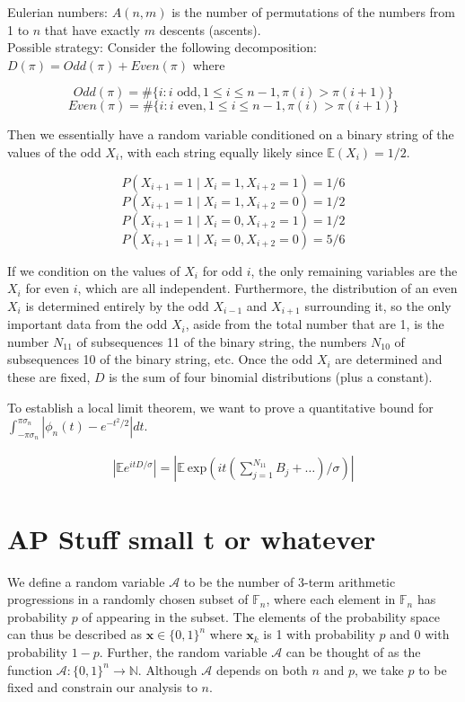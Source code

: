 \documentclass{article}
\newcommand{\p}[1]{\left(#1\right)}
\newcommand{\abs}[1]{\left\lvert#1\right\rvert}
\newcommand{\ap}{\mathcal{A}}
\newcommand{\E}{\mathbb{E}}
\newcommand{\F}{\mathbb{F}}
\newcommand{\bbn}{\mathbb{N}}
\newcommand{\bfx}{\mathbf{x}}
\theoremstyle{definition}
\theoremstyle{remark}
\begin{document}
Eulerian numbers: $A(n,m)$ is the number of permutations of the numbers from 1 to $n$ that have exactly $m$ descents (ascents). \\
Possible strategy: Consider the following decomposition: $D(\pi) = Odd(\pi) + Even(\pi)$ where

\[Odd(\pi) = \#\{i: i \text{ odd}, 1\leq i \leq n-1, \pi(i) > \pi(i+1)\}\]
\[Even(\pi) = \#\{i: i \text{ even}, 1\leq i \leq n-1, \pi(i) > \pi(i+1)\}\]

Then we essentially have a random variable conditioned on a binary string of the values of the odd $X_i$, with each string equally likely since $\E(X_i) = 1/2$.

\[ P(X_{i+1} = 1 \mid X_i = 1, X_{i+2} = 1) = 1/6 \]
\[ P(X_{i+1} = 1 \mid X_i = 1, X_{i+2} = 0) = 1/2 \]
\[ P(X_{i+1} = 1 \mid X_i = 0, X_{i+2} = 1) = 1/2 \]
\[ P(X_{i+1} = 1 \mid X_i = 0, X_{i+2} = 0) = 5/6 \]

If we condition on the values of $X_i$ for odd $i$, the only remaining variables are the $X_i$ for even $i$, which are all independent. Furthermore, the distribution of an even $X_i$ is determined entirely by the odd $X_{i-1}$ and $X_{i+1}$ surrounding it, so the only important data from the odd $X_i$, aside from the total number that are 1, is the number $N_{11}$ of subsequences 11 of the binary string, the numbers $N_{10}$ of subsequences 10 of the binary string, etc. Once the odd $X_i$ are determined and these are fixed, $D$ is the sum of four binomial distributions (plus a constant).

To establish a local limit theorem, we want to prove a quantitative bound for $\int_{-\pi\sigma_n}^{\pi\sigma_n} \abs{\phi_n(t) - e^{-t^2/2}} dt$.


\begin{align*}
\abs{\E e^{itD/\sigma}} = \abs{\E\  \mathrm{exp}\p{it\p{\sum_{j=1}^{N_{11}} B_j + \ldots}/\sigma}}
\end{align*}

\section{AP Stuff small t or whatever}
We define a random variable $\ap$ to be the number of 3-term arithmetic progressions in a randomly chosen subset of $\F_n$, where each element in $\F_n$ has probability $p$ of appearing in the subset. The elements of the probability space can thus be described as $\bfx \in \{0,1\}^n$ where $\bfx_k$ is 1 with probability $p$ and 0 with probability $1-p$. Further, the random variable $\ap$ can be thought of as the function $\ap : \{0,1\}^n \to \bbn$. Although $\ap$ depends on both $n$ and $p$, we take $p$ to be fixed and constrain our analysis to $n$.
\end{document}
